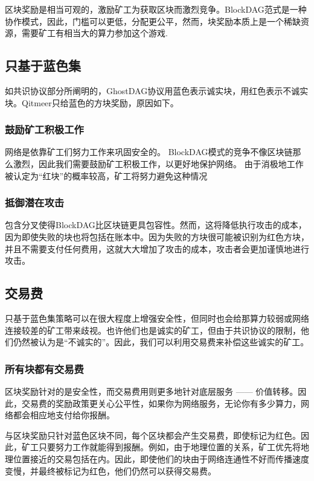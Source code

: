 \documentclass[a4paper,11pt]{article}
\begin{document}
区块奖励是相当可观的，激励矿工为获取区块而激烈竞争。BlockDAG范式是一种协作模式，因此，门槛可以更低，分配更公平，然而，块奖励本质上是一个稀缺资源，需要矿工有相当大的算力参加这个游戏. 

\subsection*{只基于蓝色集}
如共识协议部分所阐明的，GhostDAG协议用蓝色表示诚实块，用红色表示不诚实块。Qitmeer只给蓝色的方块奖励，原因如下。

\subsubsection*{鼓励矿工积极工作}
网络是依靠矿工们努力工作来巩固安全的。
BlockDAG模式的竞争不像区块链那么激烈，因此我们需要鼓励矿工积极工作，以更好地保护网络。
由于消极地工作被认定为“红块”的概率较高，矿工将努力避免这种情况

\subsubsection*{抵御潜在攻击}
包含分叉使得BlockDAG比区块链更具包容性。然而，这将降低执行攻击的成本，因为即使失败的块也将包括在账本中。因为失败的方块很可能被识别为红色方块，并且不需要支付任何费用，这就大大增加了攻击的成本，攻击者会更加谨慎地进行攻击。

\subsection{交易费}

只基于蓝色集策略可以在很大程度上增强安全性，但同时也会给那算力较弱或网络连接较差的矿工带来歧视。也许他们也是诚实的矿工，但由于共识协议的限制，他们仍然被认为是“不诚实的”。因此，我们可以利用交易费来补偿这些诚实的矿工。

\subsubsection{所有块都有交易费}
区块奖励针对的是安全性，而交易费用则更多地针对底层服务 —— 价值转移。因此，交易费的奖励政策更关心公平性，如果你为网络服务，无论你有多少算力，网络都会相应地支付给你报酬。


与区块奖励只针对蓝色区块不同，每个区块都会产生交易费，即使标记为红色。因此，矿工只要努力工作就能得到报酬。例如，由于地理位置的关系，矿工优先将地理位置接近的交易包括在内。因此，即使他们的块由于网络连通性不好而传播速度变慢，并最终被标记为红色，他们仍然可以获得交易费。
\end{document}
